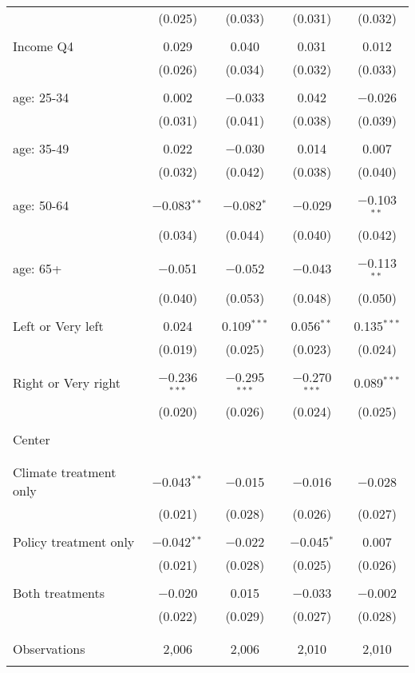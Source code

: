 \begin{tabular}{@{\extracolsep{5pt}}lcccc}
  & (0.025) & (0.033) & (0.031) & (0.032) \\ 
  & & & & \\ 
 Income Q4 & 0.029 & 0.040 & 0.031 & 0.012 \\ 
  & (0.026) & (0.034) & (0.032) & (0.033) \\ 
  & & & & \\ 
 age: 25-34 & 0.002 & $-$0.033 & 0.042 & $-$0.026 \\ 
  & (0.031) & (0.041) & (0.038) & (0.039) \\ 
  & & & & \\ 
 age: 35-49 & 0.022 & $-$0.030 & 0.014 & 0.007 \\ 
  & (0.032) & (0.042) & (0.038) & (0.040) \\ 
  & & & & \\ 
 age: 50-64 & $-$0.083$^{**}$ & $-$0.082$^{*}$ & $-$0.029 & $-$0.103$^{**}$ \\ 
  & (0.034) & (0.044) & (0.040) & (0.042) \\ 
  & & & & \\ 
 age: 65+ & $-$0.051 & $-$0.052 & $-$0.043 & $-$0.113$^{**}$ \\ 
  & (0.040) & (0.053) & (0.048) & (0.050) \\ 
  & & & & \\ 
 Left or Very left & 0.024 & 0.109$^{***}$ & 0.056$^{**}$ & 0.135$^{***}$ \\ 
  & (0.019) & (0.025) & (0.023) & (0.024) \\ 
  & & & & \\ 
 Right or Very right & $-$0.236$^{***}$ & $-$0.295$^{***}$ & $-$0.270$^{***}$ & 0.089$^{***}$ \\ 
  & (0.020) & (0.026) & (0.024) & (0.025) \\ 
  & & & & \\ 
 Center &  &  &  &  \\ 
  &  &  &  &  \\ 
  & & & & \\ 
 Climate treatment only & $-$0.043$^{**}$ & $-$0.015 & $-$0.016 & $-$0.028 \\ 
  & (0.021) & (0.028) & (0.026) & (0.027) \\ 
  & & & & \\ 
 Policy treatment only & $-$0.042$^{**}$ & $-$0.022 & $-$0.045$^{*}$ & 0.007 \\ 
  & (0.021) & (0.028) & (0.025) & (0.026) \\ 
  & & & & \\ 
 Both treatments & $-$0.020 & 0.015 & $-$0.033 & $-$0.002 \\ 
  & (0.022) & (0.029) & (0.027) & (0.028) \\ 
  & & & & \\ 
\hline \\[-1.8ex] 

Observations & 2,006 & 2,006 & 2,010 & 2,010 \\ 
\hline 
\hline \\[-1.8ex] 
\end{tabular} 